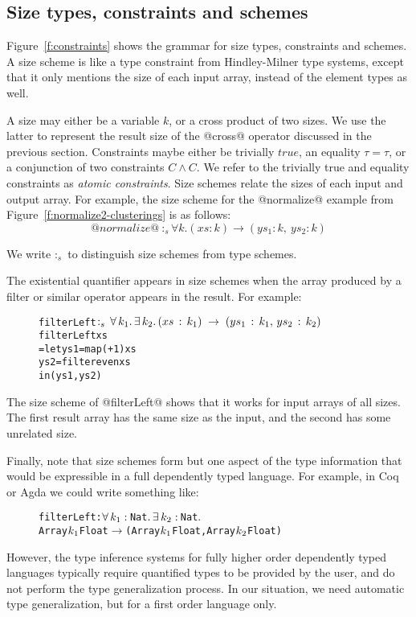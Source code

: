 \newcommand{\constr}[1]{\llbracket #1 \rrbracket}


\subsection{Size types, constraints and schemes}
\label{s:SizeTypes}
Figure~\ref{f:constraints} shows the grammar for size types, constraints and schemes. A size scheme is like a type constraint from Hindley-Milner type systems, except that it only mentions the size of each input array, instead of the element types as well.

A size may either be a variable $k$, or a cross product of two sizes. We use the latter to represent the result size of the @cross@ operator discussed in the previous section. Constraints maybe either be trivially $true$, an equality $\tau = \tau$, or a conjunction of two constraints $C \wedge C$. We refer to the trivially true and equality constraints as \emph{atomic constraints}. Size schemes relate the sizes of each input and output array. For example, the size scheme for the @normalize@ example from Figure~\ref{f:normalize2-clusterings} is as follows:
$$@normalize@ ~:_s \forall k. (xs : k) \to (ys_1 : k,~ ys_2 : k)
$$

We write $:_s$ to distinguish size schemes from type schemes.

The existential quantifier appears in size schemes when the array produced by a filter or similar operator appears in the result. For example:
\begin{figure}[H]
\begin{alltt}
 filterLeft \(:\sb{s}\,\forall\,k\sb{1}.\,\exists\,k\sb{2}.\,(xs\,:\,k\sb{1})\;\to\;(ys\sb{1}\,:\,k\sb{1},\,ys\sb{2}\,:\,k\sb{2})\)
 filterLeft xs
   = let ys1 = map (+ 1)   xs
         ys2 = filter even xs
     in (ys1, ys2)
\end{alltt}
\end{figure}

The size scheme of @filterLeft@ shows that it works for input arrays of all sizes. The first result array has the same size as the input, and the second has some unrelated size.

Finally, note that size schemes form but one aspect of the type information that would be expressible in a full dependently typed language. For example, in Coq or Agda we could write something like:
\begin{figure}[H]
\begin{alltt}
 filterLeft : \(\forall\,k\sb{1}:\,\)Nat\(.\,\exists\,k\sb{2}:\,\)Nat\(.\) 
   Array \(k\sb{1}\) Float \(\to\) (Array \(k\sb{1}\) Float, Array \(k\sb{2}\) Float)
\end{alltt}
\end{figure}
However, the type inference systems for fully higher order dependently typed languages typically require quantified types to be provided by the user, and do not perform the type generalization process. In our situation, we need automatic type generalization, but for a first order language only.


